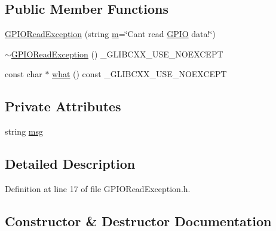 \subsection*{Public Member Functions}
\begin{DoxyCompactItemize}
\item 
\hyperlink{class_hardware_1_1_exception_1_1_g_p_i_o_read_exception_a689a2d0cefc6eb5528ad6e7200fbf5f5}{G\+P\+I\+O\+Read\+Exception} (string \hyperlink{_gen_blob_8m_ab3cd915d758008bd19d0f2428fbb354a}{m}=\char`\"{}Can\textquotesingle{}t read \hyperlink{class_hardware_1_1_g_p_i_o}{G\+P\+I\+O} data!\char`\"{})
\item 
\hyperlink{class_hardware_1_1_exception_1_1_g_p_i_o_read_exception_a97a5da2dc97609b2168a53f52589a0fb}{$\sim$\+G\+P\+I\+O\+Read\+Exception} () \+\_\+\+G\+L\+I\+B\+C\+X\+X\+\_\+\+U\+S\+E\+\_\+\+N\+O\+E\+X\+C\+E\+P\+T
\item 
const char $\ast$ \hyperlink{class_hardware_1_1_exception_1_1_g_p_i_o_read_exception_a45c94f4cf40537716cf7c0acfe3ebe29}{what} () const \+\_\+\+G\+L\+I\+B\+C\+X\+X\+\_\+\+U\+S\+E\+\_\+\+N\+O\+E\+X\+C\+E\+P\+T
\end{DoxyCompactItemize}
\subsection*{Private Attributes}
\begin{DoxyCompactItemize}
\item 
string \hyperlink{class_hardware_1_1_exception_1_1_g_p_i_o_read_exception_a51fe12853bc4ee2ef0f6cabd117b844e}{msg}
\end{DoxyCompactItemize}


\subsection{Detailed Description}


Definition at line 17 of file G\+P\+I\+O\+Read\+Exception.\+h.



\subsection{Constructor \& Destructor Documentation}
\hypertarget{class_hardware_1_1_exception_1_1_g_p_i_o_read_exception_a689a2d0cefc6eb5528ad6e7200fbf5f5}{}
